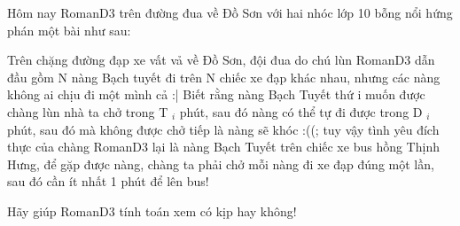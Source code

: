 Hôm nay RomanD3 trên đường đua về Đồ Sơn với hai nhóc lớp 10 bỗng nổi hứng phán một bài như sau:  

   Trên chặng đường đạp xe vất vả về Đồ Sơn, đội đua do chú lùn RomanD3 dẫn đầu gồm N nàng Bạch tuyết đi trên N chiếc xe đạp khác nhau, nhưng các nàng không ai chịu đi một mình cả :| Biết rằng nàng Bạch Tuyết thứ i muốn được chàng lùn nhà ta chở trong T   $_    i   $   phút, sau đó nàng có thể tự đi được trong D   $_    i   $   phút, sau đó mà không được chở tiếp là nàng sẽ khóc :((; tuy vậy tình yêu đích thực của chàng RomanD3 lại là nàng Bạch Tuyết trên chiếc xe bus hồng Thịnh Hưng, để gặp được nàng, chàng ta phải chở mỗi nàng đi xe đạp đúng một lần, sau đó cần ít nhất 1 phút để lên bus!  

   Hãy giúp RomanD3 tính toán xem có kịp hay không!